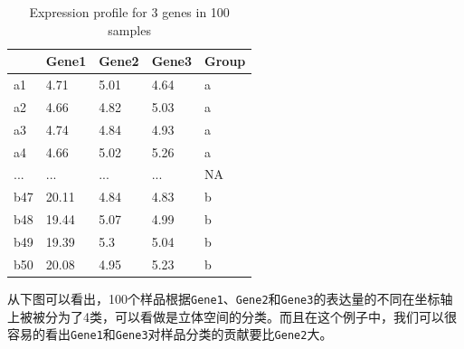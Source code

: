 \documentclass[]{article}
\newenvironment{Shaded}{\begin{snugshade}}{\end{snugshade}}
\newcommand{\KeywordTok}[1]{\textcolor[rgb]{0.13,0.29,0.53}{\textbf{{#1}}}}
\newcommand{\DataTypeTok}[1]{\textcolor[rgb]{0.13,0.29,0.53}{{#1}}}
\newcommand{\DecValTok}[1]{\textcolor[rgb]{0.00,0.00,0.81}{{#1}}}
\newcommand{\StringTok}[1]{\textcolor[rgb]{0.31,0.60,0.02}{{#1}}}
\newcommand{\CommentTok}[1]{\textcolor[rgb]{0.56,0.35,0.01}{\textit{{#1}}}}
\newcommand{\NormalTok}[1]{{#1}}
\numberwithin{figure}{section}
\numberwithin{table}{section}
\theoremstyle{definition}
\theoremstyle{definition}
\theoremstyle{definition}
\theoremstyle{remark}
\begin{document}
\begin{table}

\caption{\label{tab:datainit3}Expression profile for 3 genes in 100 samples}
\centering
\begin{tabular}[t]{lllll}
\toprule
  & Gene1 & Gene2 & Gene3 & Group\\
\midrule
a1 & 4.71 & 5.01 & 4.64 & a\\
a2 & 4.66 & 4.82 & 5.03 & a\\
a3 & 4.74 & 4.84 & 4.93 & a\\
a4 & 4.66 & 5.02 & 5.26 & a\\
... & ... & ... & ... & NA\\
\addlinespace
b47 & 20.11 & 4.84 & 4.83 & b\\
b48 & 19.44 & 5.07 & 4.99 & b\\
b49 & 19.39 & 5.3 & 5.04 & b\\
b50 & 20.08 & 4.95 & 5.23 & b\\
\bottomrule
\end{tabular}
\end{table}

从下图可以看出，100个样品根据\texttt{Gene1}、\texttt{Gene2}和\texttt{Gene3}的表达量的不同在坐标轴上被被分为了4类，可以看做是立体空间的分类。而且在这个例子中，我们可以很容易的看出\texttt{Gene1}和\texttt{Gene3}对样品分类的贡献要比\texttt{Gene2}大。

\begin{Shaded}
\end{Shaded}
\end{document}
